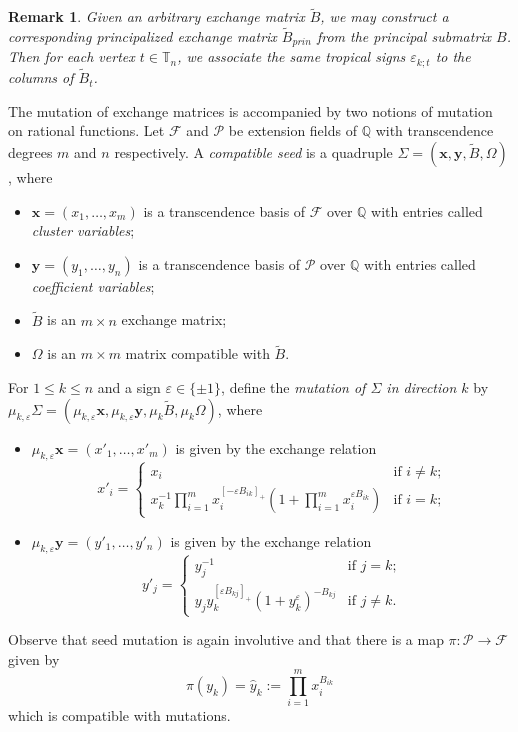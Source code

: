 \documentclass{amsart}
\newtheorem{remark}[theorem]{Remark}
\numberwithin{equation}{section}
\newcommand{\bfx}{\mathbf{x}}
\newcommand{\bfy}{\mathbf{y}}
\newcommand{\cF}{\mathcal{F}}
\newcommand{\cP}{\mathcal{P}}
\newcommand{\QQ}{\mathbb{Q}}
\newcommand{\TT}{\mathbb{T}}
\begin{document}
\begin{remark}
  Given an arbitrary exchange matrix $\tilde B$, we may construct a corresponding principalized exchange matrix $\tilde B_{prin}$ from the principal submatrix $B$.
  Then for each vertex $t\in\TT_n$, we associate the same tropical signs $\varepsilon_{k;t}$ to the columns of $\tilde B_t$.
\end{remark}

The mutation of exchange matrices is accompanied by two notions of mutation on rational functions.
Let $\cF$ and $\cP$ be extension fields of $\QQ$ with transcendence degrees $m$ and $n$ respectively.   
A \emph{compatible seed} is a quadruple $\Sigma=(\bfx,\bfy,\tilde B,\Omega)$, where
\begin{itemize}
  \item $\bfx=(x_1,\ldots,x_m)$ is a transcendence basis of $\cF$ over $\QQ$ with entries called \emph{cluster variables};
  \item $\bfy=(y_1,\ldots,y_n)$ is a transcendence basis of $\cP$ over $\QQ$ with entries called \emph{coefficient variables};
  \item $\tilde B$ is an $m\times n$ exchange matrix;
  \item $\Omega$ is an $m\times m$ matrix compatible with $\tilde B$.
\end{itemize}
For $1\le k\le n$ and a sign $\varepsilon\in\{\pm1\}$, define the \emph{mutation of $\Sigma$ in direction $k$} by $\mu_{k,\varepsilon}\Sigma=(\mu_{k,\varepsilon}\bfx,\mu_{k,\varepsilon}\bfy,\mu_k\tilde B,\mu_k\Omega)$, where 
\begin{itemize}
  \item $\mu_{k,\varepsilon}\bfx=(x'_1,\ldots,x'_m)$ is given by the exchange relation
    \begin{equation}
      \label{eq:x exchange relation}
      x'_i=\begin{cases} x_i & \text{if $i\ne k$;}\\ x_k^{-1}\prod\limits_{i=1}^m x_i^{[-\varepsilon B_{ik}]_+}\left(1+\prod\limits_{i=1}^m x_i^{\varepsilon B_{ik}}\right) & \text{if $i=k$;}\end{cases}
    \end{equation}
  \item $\mu_{k,\varepsilon}\bfy=(y'_1,\ldots,y'_n)$ is given by the exchange relation 
    \begin{equation}
      \label{eq:y exchange relation}
      y'_j=\begin{cases} y_j^{-1} & \text{if $j=k$;}\\ y_jy_k^{[\varepsilon B_{kj}]_+}(1+y_k^\varepsilon)^{-B_{kj}} & \text{if $j\ne k$.}\end{cases}
    \end{equation}
\end{itemize}
Observe that seed mutation is again involutive and that there is a map $\pi:\cP\to\cF$ given by 
\begin{equation}
  \label{eq:A to X}
  \pi(y_k)=\hat y_k:=\prod\limits_{i=1}^m x_i^{B_{ik}}
\end{equation}
which is compatible with mutations.
\end{document}
